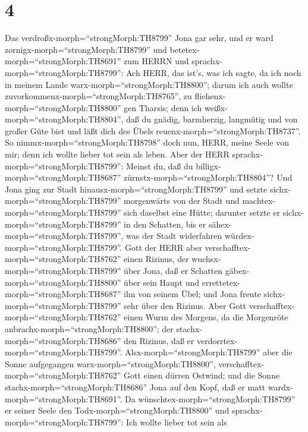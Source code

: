 \hypertarget{section-3}{%
\section{4}\label{section-3}}

 Das verdroßx-morph=``strongMorph:TH8799'' Jona gar sehr,
und er ward zornigx-morph=``strongMorph:TH8799''  und
betetex-morph=``strongMorph:TH8691'' zum HERRN und
sprachx-morph=``strongMorph:TH8799'': Ach HERR, das ist's, was ich
sagte, da ich noch in meinem Lande warx-morph=``strongMorph:TH8800'';
darum ich auch wollte zuvorkommenx-morph=``strongMorph:TH8765'', zu
fliehenx-morph=``strongMorph:TH8800'' gen Tharsis; denn ich
weißx-morph=``strongMorph:TH8804'', daß du gnädig, barmherzig, langmütig
und von großer Güte bist und läßt dich des Übels
reuenx-morph=``strongMorph:TH8737''.  So
nimmx-morph=``strongMorph:TH8798'' doch nun, HERR, meine Seele von mir;
denn ich wollte lieber tot sein als leben.  Aber der HERR
sprachx-morph=``strongMorph:TH8799'': Meinst du, daß du
billigx-morph=``strongMorph:TH8687''
zürnstx-morph=``strongMorph:TH8804''?  Und Jona ging zur
Stadt hinausx-morph=``strongMorph:TH8799'' und setzte
sichx-morph=``strongMorph:TH8799'' morgenwärts von der Stadt und
machtex-morph=``strongMorph:TH8799'' sich daselbst eine Hütte; darunter
setzte er sichx-morph=``strongMorph:TH8799'' in den Schatten, bis er
sähex-morph=``strongMorph:TH8799'', was der Stadt widerfahren
würdex-morph=``strongMorph:TH8799''.  Gott der HERR aber
verschafftex-morph=``strongMorph:TH8762'' einen Rizinus, der
wuchsx-morph=``strongMorph:TH8799'' über Jona, daß er Schatten
gäbex-morph=``strongMorph:TH8800'' über sein Haupt und
errettetex-morph=``strongMorph:TH8687'' ihn von seinem Übel; und Jona
freute sichx-morph=``strongMorph:TH8799'' sehr über den Rizinus.
 Aber Gott verschafftex-morph=``strongMorph:TH8762'' einen
Wurm des Morgens, da die Morgenröte
anbrachx-morph=``strongMorph:TH8800''; der
stachx-morph=``strongMorph:TH8686'' den Rizinus, daß er
verdorrtex-morph=``strongMorph:TH8799''. 
Alsx-morph=``strongMorph:TH8799'' aber die Sonne aufgegangen
warx-morph=``strongMorph:TH8800'',
verschafftex-morph=``strongMorph:TH8762'' Gott einen dürren Ostwind; und
die Sonne stachx-morph=``strongMorph:TH8686'' Jona auf den Kopf, daß er
matt wardx-morph=``strongMorph:TH8691''. Da
wünschtex-morph=``strongMorph:TH8799'' er seiner Seele den
Todx-morph=``strongMorph:TH8800'' und
sprachx-morph=``strongMorph:TH8799'': Ich wollte lieber tot sein als
